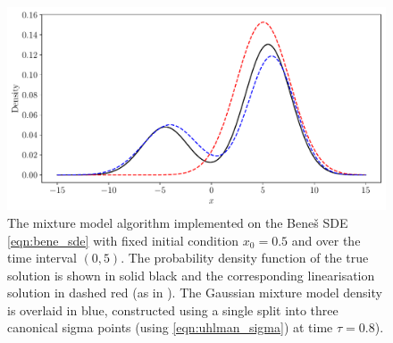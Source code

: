 \begin{figure}
	\centering
	\includegraphics[width=\textwidth]{chp05_gmm/figures/bene_final_gmm}
	\caption{The mixture model algorithm implemented on the Bene\v{s} SDE \cref{eqn:bene_sde} with fixed initial condition \(x_0 = 0.5\) and over the time interval \((0,5)\).
		The probability density function of the true solution is shown in solid black and the corresponding linearisation solution in dashed red (as in ).
		The Gaussian mixture model density is overlaid in blue, constructed using a single split into three canonical sigma points (using \cref{eqn:uhlman_sigma}) at time \(\tau = 0.8\)).}
	\label{fig:bene_gmm}
\end{figure}

